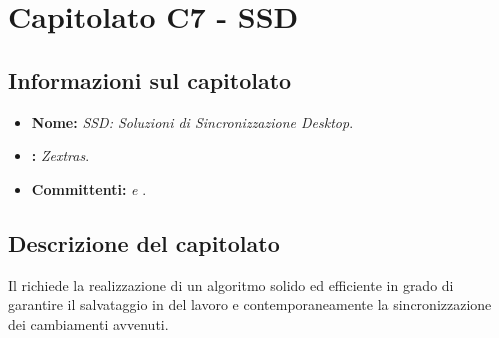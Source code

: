 \section{Capitolato C7 - SSD}\label{C7}
\subsection{Informazioni sul capitolato}
\begin{itemize}
	\item \textbf{Nome:} \textit{SSD: Soluzioni di Sincronizzazione Desktop}.
	\item \textbf{:} \textit{Zextras}.
	\item \textbf{Committenti:} \textit{\VT{} e \CR{}}.
\end{itemize}

\subsection{Descrizione del capitolato}
Il  richiede la realizzazione di un algoritmo solido ed efficiente in grado di garantire il salvataggio in  del lavoro e contemporaneamente la sincronizzazione dei cambiamenti avvenuti.

